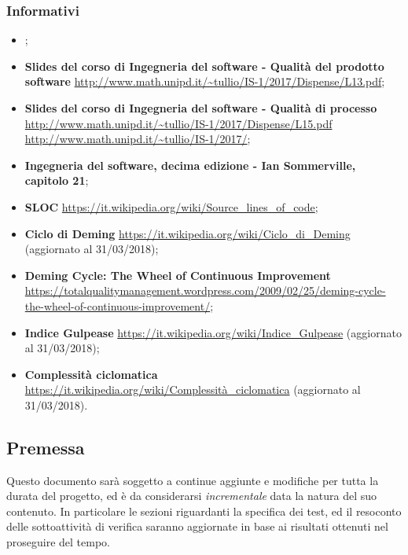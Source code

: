 \subsubsection{Informativi}
\begin{itemize}
	\item
	\textbf{\PdP{}};
	\item
	\textbf{Slides del corso di Ingegneria del software - Qualità del prodotto software}
	\url{http://www.math.unipd.it/~tullio/IS-1/2017/Dispense/L13.pdf};
	\item
	\textbf{Slides del corso di Ingegneria del software - Qualità di processo}
	\url{http://www.math.unipd.it/~tullio/IS-1/2017/Dispense/L15.pdf}
	\url{http://www.math.unipd.it/~tullio/IS-1/2017/};
	\item 
	\textbf{Ingegneria del software, decima edizione - Ian Sommerville, capitolo 21};
	\item
	\textbf{SLOC}
	\url{https://it.wikipedia.org/wiki/Source_lines_of_code};
	\item
	\textbf{Ciclo di Deming}
	\url{https://it.wikipedia.org/wiki/Ciclo_di_Deming} (aggiornato al 31/03/2018);
	\item
	\textbf{Deming Cycle: The Wheel of Continuous Improvement}
	\url{https://totalqualitymanagement.wordpress.com/2009/02/25/deming-cycle-the-wheel-of-continuous-improvement/};
	\item
	\textbf{Indice Gulpease}
	\url{https://it.wikipedia.org/wiki/Indice_Gulpease} (aggiornato al 31/03/2018);
	\item
	\textbf{Complessità ciclomatica}
	\url{https://it.wikipedia.org/wiki/Complessità_ciclomatica} (aggiornato al 31/03/2018).
	
\end{itemize}

\subsection{Premessa}
Questo documento sarà soggetto a continue aggiunte e modifiche per tutta la durata del progetto, ed è da considerarsi \textit{incrementale} data la natura del suo contenuto. In particolare le sezioni riguardanti la specifica dei test, ed il resoconto delle sottoattività di verifica saranno aggiornate in base ai risultati ottenuti nel proseguire del tempo.
